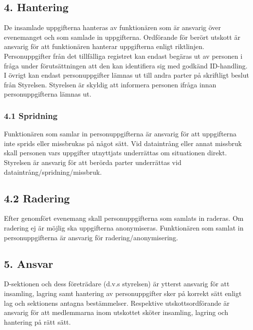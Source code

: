 \documentclass{dsekkallelse}
\begin{document}
\subsection{4. Hantering}
De insamlade uppgifterna hanteras av funktionären som är ansvarig över evenemanget och som samlade
in uppgifterna. Ordförande för berört utskott är ansvarig för att funktionären hanterar uppgifterna enligt riktlinjen. Personuppgifter från det tillfälliga registret kan endast begäras ut av personen i fråga under förutsättningen att den kan identifiera sig med godkänd ID-handling. I övrigt kan endast personuppgifter lämnas ut till andra parter på skriftligt beslut från Styrelsen. Styrelsen är skyldig att informera personen ifråga innan personuppgifterna lämnas ut.

\subsubsection{4.1 Spridning}
Funktionären som samlar in personuppgifterna är ansvarig för att uppgifterna inte sprids eller missbrukas på något sätt. Vid dataintrång eller annat missbruk skall personen vars uppgifter utnyttjats underrättas om situationen direkt. Styrelsen är ansvarig för att berörda parter underrättas vid dataintrång/spridning/missbruk.

\subsection{4.2 Radering}
Efter genomfört evenemang skall personuppgifterna som samlats in raderas. Om radering ej är möjlig ska
uppgifterna anonymiseras. Funktionären som samlat in personuppgifterna är ansvarig för
radering/anonymisering.

\subsection{5. Ansvar}
D-sektionen och dess företrädare (d.v.s styrelsen) är ytterst ansvarig för att insamling, lagring samt hantering av personuppgifter sker på korrekt sätt enligt lag och sektionens antagna bestämmelser. Respektive utskottsordförande är ansvarig för att medlemmarna inom utskottet
sköter insamling, lagring och hantering på rätt sätt.

\end{document}
